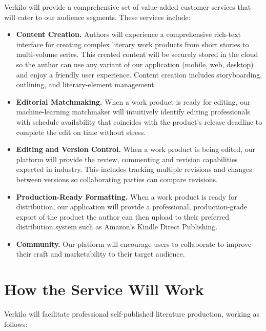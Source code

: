 \documentclass[10pt,openany]{book}
\providecommand{\tightlist}{%
  \setlength{\itemsep}{0pt}\setlength{\parskip}{0pt}}
\begin{document}
Verkilo will provide a comprehensive set of value-added customer
services that will cater to our audience segments. These services
include:

\begin{itemize}
\tightlist
\item
  \textbf{Content Creation.} Authors will experience a comprehensive
  rich-text interface for creating complex literary work products from
  short stories to multi-volume series. This created content will be
  securely stored in the cloud so the author can use any variant of our
  application (mobile, web, desktop) and enjoy a friendly user
  experience. Content creation includes storyboarding, outlining, and
  literary-element management.
\item
  \textbf{Editorial Matchmaking.} When a work product is ready for
  editing, our machine-learning matchmaker will intuitively identify
  editing professionals with schedule availability that coincides with
  the product's release deadline to complete the edit on time without
  stress.
\item
  \textbf{Editing and Version Control.} When a work product is being
  edited, our platform will provide the review, commenting and revision
  capabilities expected in industry. This includes tracking multiple
  revisions and changes between versions so collaborating parties can
  compare revisions.
\item
  \textbf{Production-Ready Formatting.} When a work product is ready for
  distribution, our application will provide a professional,
  production-grade export of the product the author can then upload to
  their preferred distribution system such as Amazon's Kindle Direct
  Publishing.
\item
  \textbf{Community.} Our platform will encourage users to collaborate
  to improve their craft and marketability to their target audience.
\end{itemize}

\hypertarget{how-the-service-will-work}{%
\section{How the Service Will Work}\label{how-the-service-will-work}}

Verkilo will facilitate professional self-published literature
production, working as follows:
\end{document}
